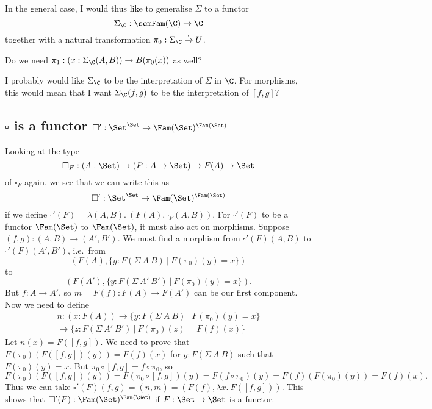 \documentclass{article}
\begin{document}
In the general case, I would thus like to generalise $\Sigma$ to a functor
\[
\Sigma_{\C} : \semFam(\C) \to \C
\]
together with a natural transformation $\pi_0 : \Sigma_{\C} \xrightarrow{\cdot} U$.

\begin{question}
  Do we need $\pi_1 : (x : \Sigma_{\C}(A, B)) \to B(\pi_0(x))$
  as well?
\end{question}

\begin{question}
  I probably would like $\Sigma_{\C}$ to be the interpretation
  of $\Sigma$ in $\C$. For morphisms, this would mean that I
  want $\Sigma_{\C}(f,g)$ to be the interpretation of $[f,g]$?
\end{question}

\subsection{$\square$ is a functor $\square' : \Set^{\Set} \to \Fam(\Set)^{\Fam(\Set)}$}

Looking at the type 
\[
\square_F : (A : \Set) \to (P : A \to \Set) \to F(A) \to \Set
\]
of $\square_F$ again, we see that we can write this as
\[
\square' : \Set^{\Set} \to \Fam(\Set)^{\Fam(\Set)}
\]
if we define $\square'(F) = \lambda (A, B) .\ (F(A), \square_F(A,
B))$. For $\square'(F)$ to be a functor $\Fam(\Set)$ to $\Fam(\Set)$,
it must also act on morphisms. Suppose $(f, g) : (A, B) \to (A',
B')$. We must find a morphism from $\square'(F)(A, B)$ to
$\square'(F)(A', B')$, i.e.\ from
\[
(F(A),  \{ y : F(\Sigma\ A\ B)\ |\ F(\pi_0)(y) = x \})
\]
to
\[
(F(A'),  \{ y : F(\Sigma\ A'\ B')\ |\ F(\pi_0)(y) = x \}).
\]
But $f : A \to A'$, so $m = F(f) : F(A) \to F(A')$ can be our first
component. Now we need to define
\begin{multline*}
  n : (x : F(A)) \to \{ y : F(\Sigma\ A\ B)\ |\ F(\pi_0)(y) = x \} \\
  \to \{ z : F(\Sigma\ A'\ B')\ |\ F(\pi_0)(z) = F(f)(x) \}
\end{multline*}
Let $n(x) = F([f, g])$. We need to prove that $F(\pi_0)(F([f, g])(y))
= F(f)(x)$ for $y : F(\Sigma\ A\ B)$ such that $F(\pi_0)(y) = x$. But
$\pi_0 \circ [f, g] = f \circ \pi_0$, so
\[
F(\pi_0)(F([f, g])(y)) = F(\pi_0 \circ [f, g])(y) = F(f \circ
\pi_0)(y) = F(f)(F(\pi_0)(y)) = F(f)(x).
\]
Thus we can take $\square'(F)(f,g) = (n, m) = (F(f), \lambda x .\
F([f,g]))$. This shows that $\square'(F) : \Fam(\Set)^{\Fam(\Set)}$ if
$F : \Set \to \Set$ is a functor.
\end{document}
